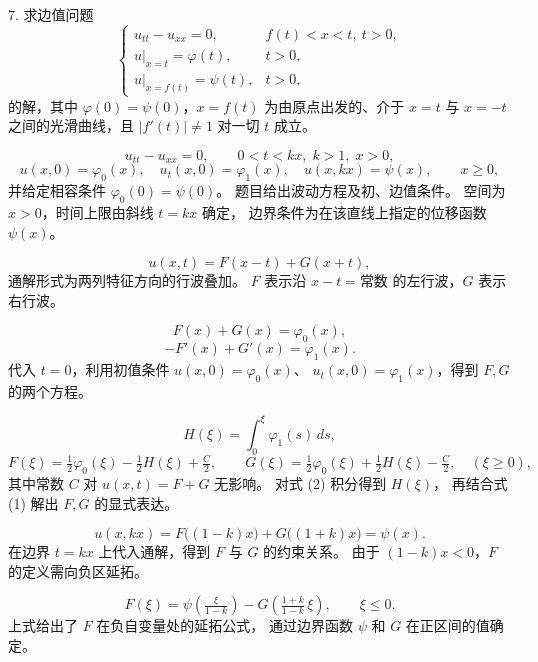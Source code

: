 \begin{exercise}
7. 求边值问题
\[
\begin{cases}
u_{tt} - u_{xx} = 0, & f(t)<x<t,\ t>0, \\[6pt]
u|_{x=t} = \varphi(t), & t>0, \\[6pt]
u|_{x=f(t)} = \psi(t), & t>0,
\end{cases}
\]
的解，其中 $\varphi(0)=\psi(0)$，$x=f(t)$ 为由原点出发的、介于 $x=t$ 与 $x=-t$ 之间的光滑曲线，且 $|f'(t)|\neq 1$ 对一切 $t$ 成立。
\end{exercise}
\begin{solution}
    \begin{dxsolution}
\[
u_{tt}-u_{xx}=0,\qquad 0<t<kx,\;k>1,\;x>0,
\]
\[
u(x,0)=\varphi_0(x),\quad u_t(x,0)=\varphi_1(x),\quad 
u(x,kx)=\psi(x),\qquad x\ge0,
\]
并给定相容条件 $\varphi_0(0)=\psi(0)$。
\tcblower
题目给出波动方程及初、边值条件。  
空间为 $x>0$，时间上限由斜线 $t=kx$ 确定，  
边界条件为在该直线上指定的位移函数 $\psi(x)$。
\end{dxsolution}

\begin{dxsolution}
\[
u(x,t)=F(x-t)+G(x+t),
\]
\tcblower
通解形式为两列特征方向的行波叠加。  
$F$ 表示沿 $x-t=\text{常数}$ 的左行波，$G$ 表示右行波。
\end{dxsolution}

\begin{dxsolution}
\[
F(x)+G(x)=\varphi_0(x), \tag{1}
\]
\[
-F'(x)+G'(x)=\varphi_1(x). \tag{2}
\]
\tcblower
代入 $t=0$，利用初值条件 $u(x,0)=\varphi_0(x)$、  
$u_t(x,0)=\varphi_1(x)$，得到 $F,G$ 的两个方程。
\end{dxsolution}

\begin{dxsolution}
\[
H(\xi)=\int_0^{\xi}\varphi_1(s)\,ds,
\]
\[
F(\xi)=\tfrac12\varphi_0(\xi)-\tfrac12H(\xi)+\tfrac{C}{2},\qquad
G(\xi)=\tfrac12\varphi_0(\xi)+\tfrac12H(\xi)-\tfrac{C}{2},\quad (\xi\ge0),
\]
其中常数 $C$ 对 $u(x,t)=F+G$ 无影响。
\tcblower
对式 (2) 积分得到 $H(\xi)$，  
再结合式 (1) 解出 $F,G$ 的显式表达。
\end{dxsolution}

\begin{dxsolution}
\[
u(x,kx)=F\big((1-k)x\big)+G\big((1+k)x\big)=\psi(x).
\]
\tcblower
在边界 $t=kx$ 上代入通解，得到 $F$ 与 $G$ 的约束关系。  
由于 $(1-k)x<0$，$F$ 的定义需向负区延拓。
\end{dxsolution}

\begin{dxsolution}
\[
F(\xi)=\psi\!\left(\tfrac{\xi}{1-k}\right)
 -G\!\left(\tfrac{1+k}{1-k}\,\xi\right),\qquad \xi\le0.
\]
\tcblower
上式给出了 $F$ 在负自变量处的延拓公式，  
通过边界函数 $\psi$ 和 $G$ 在正区间的值确定。
\end{dxsolution}


\end{solution}
